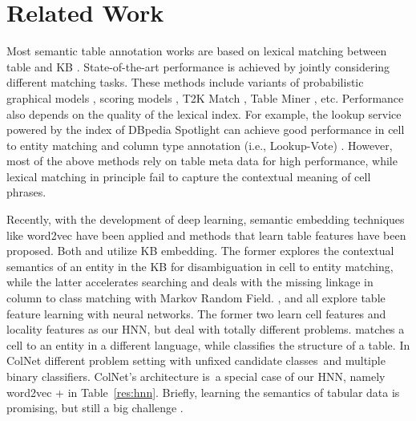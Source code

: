 \documentclass{article}
\begin{document}
\section{Related Work}\label{sec:related_work}
Most semantic table annotation works are based on lexical matching between table and KB \cite{venetis2011recovering,pham2016semantic,cafarella2018ten}.
State-of-the-art performance is achieved by jointly considering different matching tasks.
These methods include variants of probabilistic graphical models \cite{limaye2010annotating,mulwad2013semantic,bhagavatula2015tabel},
scoring models \cite{chu2015katara},
T2K Match \cite{ritze2015matching}, Table Miner \cite{zhang2017effective}, etc.
Performance also depends on the quality of the lexical index.
For example, the lookup service powered by the index of DBpedia Spotlight \cite{mendes2011dbpedia} 
can achieve good performance in cell to entity matching and column type annotation (i.e., Lookup-Vote) \cite{chen2019colnet}.
However, most of the above methods rely on table meta data for high performance, 
while lexical matching in principle fail to capture the contextual meaning of cell phrases.

Recently, with the development of deep learning, semantic embedding techniques like word2vec \cite{mikolov2013distributed} have been applied and 
methods that learn table features have been proposed.
Both \cite{efthymiou2017matching} 
and \cite{kunihiro2019meimei} utilize KB embedding.
The former explores the contextual semantics of an entity in the KB for disambiguation in cell to entity matching, 
while the latter accelerates searching and deals with the missing linkage in column to class matching with Markov Random Field.
\cite{luo2018cross}, \cite{nishida2017understanding} and \cite{chen2019colnet} all explore table feature learning with neural networks.
The former two learn cell features and locality features as our HNN, but deal with totally different problems.
\cite{luo2018cross} matches a cell to an entity in a different language, while \cite{nishida2017understanding} classifies the structure of a table.
In ColNet \cite{chen2019colnet we predict column types with a} different problem setting with unfixed candidate classes~and multiple binary classifiers. 
ColNet's architecture is~a special case of our HNN, namely word2vec +  in Table~\ref{res:hnn}.
Briefly, learning the semantics of tabular data is promising, but still a big challenge \cite{thirumuruganathan2018data}.
\end{document}
